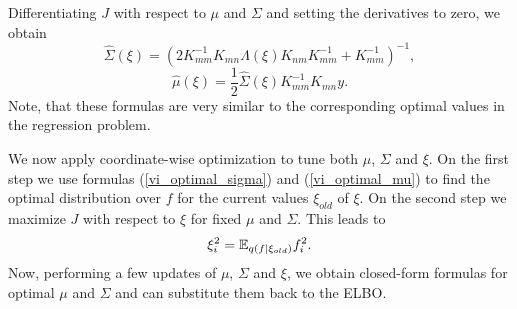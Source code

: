 Differentiating $J$ with respect to $\mu$ and $\Sigma$ and setting the derivatives to zero, we obtain
\begin{equation}\label{vi_optimal_sigma}
	\hat \Sigma(\xi) = (2 K_{mm}^{-1} K_{mn} \Lambda(\xi) K_{nm} K_{mm}^{-1} + K_{mm}^{-1})^{-1},
\end{equation}
\begin{equation}\label{vi_optimal_mu}
	\hat \mu(\xi) = \frac 1 2 \hat \Sigma(\xi) K_{mm}^{-1} K_{mn} y.
\end{equation}
Note, that these formulas are very similar to the corresponding optimal values in the regression problem.

We now apply coordinate-wise optimization to tune both $\mu$, $\Sigma$ and $\xi$. On the first step we use formulas (\ref{vi_optimal_sigma}) and (\ref{vi_optimal_mu}) to find the optimal distribution over $f$ for the current values $\xi_{old}$ of $\xi$. On the second step we maximize $J$ with respect to $\xi$ for fixed $\mu$ and $\Sigma$. This leads to
$$\xi_i^2 = \mathbb{E}_{q(f | \xi_{old})} f_i^2.$$
Now, performing a few updates of $\mu$, $\Sigma$ and $\xi$, we obtain closed-form formulas for optimal
$\mu$ and $\Sigma$ and can substitute them back to the ELBO.